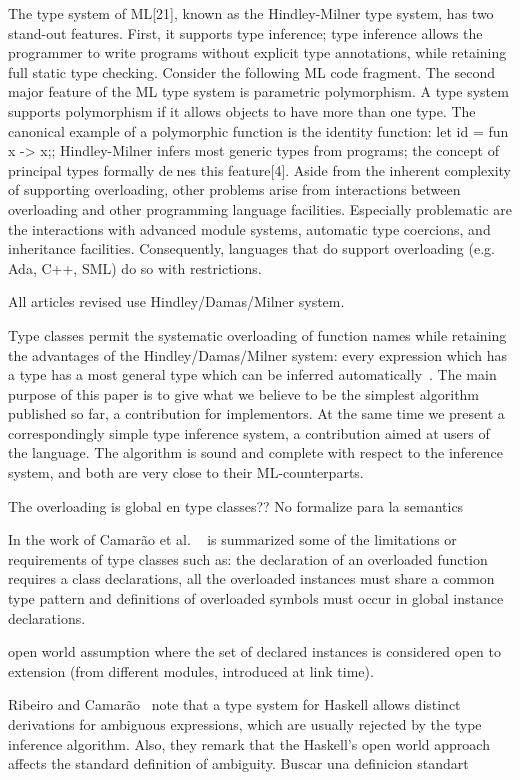 \documentclass[hidelinks, twocolumn]{article}
\begin{document}
The type system of ML[21], known as the Hindley-Milner type system, has two stand-out features. First, it supports type inference; type inference allows the programmer to write programs without explicit type annotations, while retaining full static type checking. Consider the following ML code fragment. The second major feature of the ML type system is parametric polymorphism. A type system supports polymorphism if it allows objects to have more than one type. The canonical example of a polymorphic function is the identity function:
let id = fun x -> x;; Hindley-Milner infers most generic types
from programs; the concept of principal types formally denes this feature[4].
Aside from the inherent complexity of supporting
overloading, other problems arise from interactions between overloading and
other programming language facilities. Especially problematic are the interactions
with advanced module systems, automatic type coercions, and inheritance facilities.
Consequently, languages that do support overloading (e.g. Ada, C++, SML) do so
with restrictions.

All articles revised use Hindley/Damas/Milner system.

Type classes permit the systematic overloading
of function names while retaining the advantages of the
Hindley/Damas/Milner system: every expression which
has a type has a most general type which can be inferred
automatically~\cite{Nipkow1993}. The main purpose of this paper is to give
what we believe to be the simplest algorithm published
so far, a contribution for implementors. At the same
time we present a correspondingly simple type inference
system, a contribution aimed at users of the language.
The algorithm is sound and complete with respect to
the inference system, and both are very close to their
ML-counterparts.

The overloading is global en type classes??
 No formalize para la semantics
 
In the work of Camar\~ao et al. ~\cite{Camarao1999} is summarized some of the limitations or requirements of type classes such as: the declaration of an overloaded function requires a class declarations, all the overloaded instances must share a common type pattern and definitions of overloaded symbols must occur in global instance declarations.

open world assumption where the
set of declared instances is considered open to extension (from different modules,
introduced at link time).


Ribeiro and Camar\~ao~\cite{Ribeiro2013} note that a type system for Haskell allows distinct derivations for ambiguous expressions, which are usually rejected by the type inference algorithm. Also, they remark that the Haskell's open world approach affects the standard definition of ambiguity. Buscar una definicion standart
\end{document}
